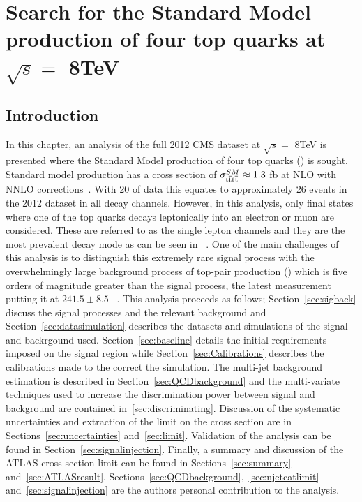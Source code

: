 \chapter{Search for the Standard Model production of four top quarks at $\sqrt{s} =$ 8TeV }
\label{c:Run1}

\section{Introduction}
In this chapter, an analysis of the full 2012 CMS dataset at $\sqrt{s} =$ 8TeV is presented where the Standard Model production of four top quarks (\tttt) is sought. Standard model \tttt production has a cross section of $\sigma_{{\mathrm{t}\overline{\mathrm{t}}\mathrm{t}\overline{\mathrm{t}}}}^{SM}  \approx 1.3$ fb at NLO with NNLO corrections~\cite{Barger201070,Bevilacqua2012}. With 20 \fbinv of data this equates to approximately 26 events in the 2012 dataset in all decay channels. However, in this analysis, only final states where one of the top quarks decays leptonically into an electron or muon are considered. These are referred to as the single lepton channels and they are the most prevalent decay mode as can be seen in ~. One of the main challenges of this analysis is to distinguish this extremely rare signal process with the overwhelmingly large background process of top-pair production (\ttbar) which is five orders of magnitude greater than the \tttt signal process, the latest measurement putting it at $241.5 \pm 8.5$ \pbinv ~\cite{CMS-PAS-TOP-14-016}. 
This analysis proceeds as follows; Section~\ref{sec:sigback} discuss the \tttt signal processes and the relevant background and Section~\ref{sec:datasimulation} describes the datasets and simulations of the signal and backrgound used. Section~\ref{sec:baseline} details the initial requirements imposed on the signal region while Section~\ref{sec:Calibrations} describes the calibrations made to the correct the simulation. The multi-jet background estimation is described in Section~\ref{sec:QCDbackground} and the multi-variate techniques used to increase the discrimination power between signal and background are contained in~\ref{sec:discriminating}. Discussion of the systematic uncertainties and extraction of the limit on the \tttt cross section are in Sections~\ref{sec:uncertainties} and~\ref{sec:limit}. Validation of the analysis can be found in Section~\ref{sec:signalinjection}. Finally, a summary and discussion of the ATLAS \tttt cross section limit can be found in Sections~\ref{sec:summary} and~\ref{sec:ATLASresult}.
Sections~\ref{sec:QCDbackground},~\ref{sec:njetcatlimit} and~\ref{sec:signalinjection} are the authors personal contribution to the analysis.


